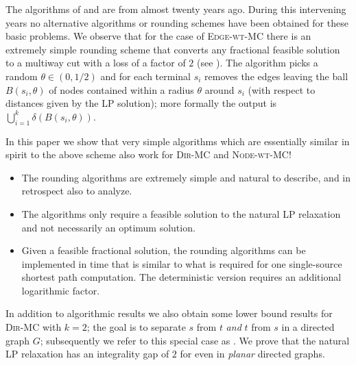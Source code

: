 \documentclass[11pt]{article}
\def\MC{\textsc{Edge-wt-MC}\xspace}
\def\DirMC{\textsc{Dir-MC}\xspace}
\def\2DirMC{\text{$st$-Bi-Cut}\xspace}
\def\NodeMC{\textsc{Node-wt-MC}\xspace}
\def\NodeMC{\textsc{Node-wt-MC}\xspace}
\begin{document}
The algorithms of \cite{GargVY04} and \cite{NaorZ01} are from almost
twenty years ago. During this intervening years no alternative
algorithms or rounding schemes have been obtained for these basic
problems. We observe that for the case of \MC there is an extremely
simple rounding scheme that converts any fractional feasible solution
to a multiway cut with a loss of a factor of $2$ (see
\cite{Vazirani-book}). The algorithm picks a random $\theta \in
(0,1/2)$ and for each terminal $s_i$ removes the edges leaving the
ball $B(s_i,\theta)$ of nodes contained within a radius $\theta$
around $s_i$ (with respect to distances given by the LP solution);
more formally the output is $\bigcup_{i=1}^k \delta(B(s_i,\theta))$.

In this paper we show that very simple algorithms which are essentially
similar in spirit to the above scheme also work for \DirMC and \NodeMC!
\begin{itemize}
\item The rounding algorithms are extremely simple and natural to
  describe, and in retrospect also to analyze. 
\item The algorithms only require a feasible solution to the natural
  LP relaxation and not necessarily an optimum solution.
\item Given a feasible fractional solution, the rounding algorithms
  can be implemented in time that is similar to what is required for
  one single-source shortest path computation. The deterministic
  version requires an additional logarithmic factor.
\end{itemize}

In addition to algorithmic results we also obtain some lower bound
results for \DirMC with $k=2$; the goal is to separate $s$ from $t$
{\em and} $t$ from $s$ in a directed graph $G$; subsequently 
we refer to this special case as \2DirMC. We prove that the
natural LP relaxation has an integrality gap of $2$ for
\2DirMC even in {\em planar} directed graphs.
\end{document}
